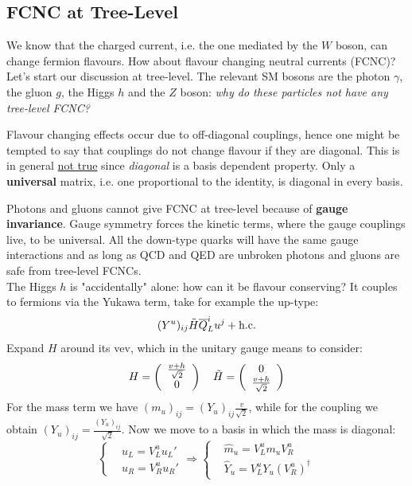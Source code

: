 \documentclass[../main.tex]{subfiles}
\begin{document}
\subsection{FCNC at Tree-Level}
We know that the charged current, i.e. the one mediated by the $W$ boson, can change fermion flavours. How about flavour changing neutral currents (FCNC)? Let's start our discussion at tree-level. The relevant SM bosons are the photon $\gamma$, the gluon $g$, the Higgs $h$ and the $Z$ boson: \textit{why do these particles not have any tree-level FCNC?}\\
\begin{kaobox}[frametitle=Remark]
Flavour changing effects occur due to off-diagonal couplings, hence one might be tempted to say that couplings do not change flavour if they are diagonal. This is in general \underline{not true} since \textit{diagonal} is a basis dependent property. Only a \textbf{universal} matrix, i.e. one proportional to the identity, is diagonal in every basis.
\end{kaobox}
Photons and gluons cannot give FCNC at tree-level because of \textbf{gauge invariance}. Gauge symmetry forces the kinetic terms, where the gauge couplings live, to be universal. All the down-type quarks will have the same gauge interactions and as long as QCD and QED are unbroken photons and gluons are safe from tree-level FCNCs.\\
The Higgs $h$ is "accidentally" alone: how can it be flavour conserving? It couples to fermions via the Yukawa term, take for example the up-type: 
\[
(Y^u)_{ij}\Tilde{H}\overline{Q}_L^iu^j+\text{h.c.}
\]
Expand $H$ around its vev, which in the unitary gauge means to consider:
\[
H=\left(\begin{array}{c}
    \frac{v+h}{\sqrt{2}} \\
    0
\end{array}\right)
\quad
\Tilde{H}=\left(\begin{array}{c}
    0\\
    \frac{v+h}{\sqrt{2}}
\end{array}\right)
\]
For the mass term we have $(m_u)_{ij}=(Y_u)_{ij}\frac{v}{\sqrt{2}}$, while for the coupling we obtain $(Y_u)_{ij}=\frac{(Y_u)_{ij}}{\sqrt{2}}$. Now we move to a basis in which the mass is diagonal:
\[
\left\{
\begin{aligned}
&u_L=V_L^uu_L'\\
&u_R=V_R^uu_R'
\end{aligned}
\right.
\Rightarrow
\left\{
\begin{aligned}
&\hat{m}_u=V_L^um_uV_R^u\\
&\hat{Y}_u=V_L^uY_u(V_R^u)^\dagger
\end{aligned}
\right.
\]
\end{document}
